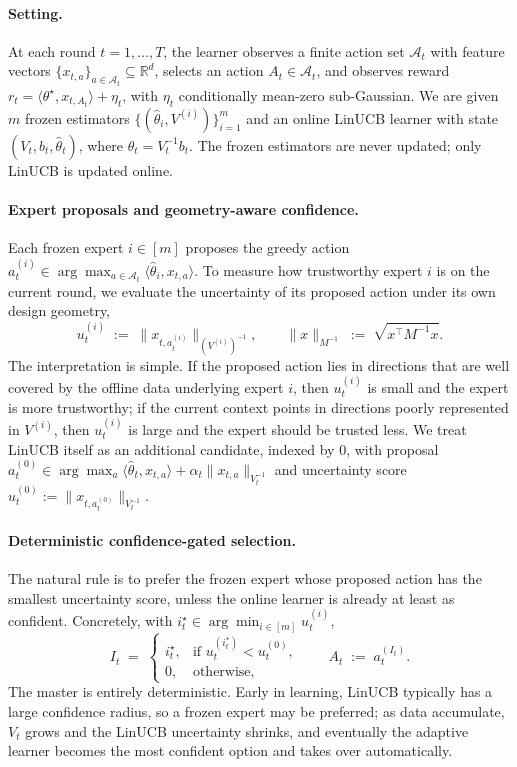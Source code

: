 \documentclass{article}
\theoremstyle{definition}
\theoremstyle{remark}
\theoremstyle{remark}
\begin{document}
\paragraph{Setting.}
At each round $t=1,\dots,T$, the learner observes a finite action set
$\mathcal A_t$ with feature vectors
$\{x_{t,a}\}_{a\in\mathcal A_t}\subseteq\mathbb R^d$, selects an action
$A_t\in\mathcal A_t$, and observes reward
$r_t = \langle\theta^\star,x_{t,A_t}\rangle + \eta_t$,
with $\eta_t$ conditionally mean-zero sub-Gaussian.
We are given $m$ frozen estimators
$\{(\widehat\theta_i,V^{(i)})\}_{i=1}^m$ and an online LinUCB learner
with state $(V_t,b_t,\widehat\theta_t)$, where
$\widehat\theta_t = V_t^{-1}b_t$. The frozen estimators are never
updated; only LinUCB is updated online.

\paragraph{Expert proposals and geometry-aware confidence.}
Each frozen expert $i\in[m]$ proposes the greedy action
$a_t^{(i)}\in\arg\max_{a\in\mathcal A_t}\langle\widehat\theta_i,x_{t,a}\rangle$.
To measure how trustworthy expert $i$ is on the current round, we
evaluate the uncertainty of its proposed action under its own design
geometry,
\[
u_t^{(i)} \;:=\; \bigl\|x_{t,a_t^{(i)}}\bigr\|_{(V^{(i)})^{-1}},
\qquad
\|x\|_{M^{-1}} \;:=\; \sqrt{x^\top M^{-1}x}.
\]
The interpretation is simple. If the proposed action lies in directions
that are well covered by the offline data underlying expert $i$, then
$u_t^{(i)}$ is small and the expert is more trustworthy; if the current
context points in directions poorly represented in $V^{(i)}$, then
$u_t^{(i)}$ is large and the expert should be trusted less. We treat
LinUCB itself as an additional candidate, indexed by $0$, with proposal
$a_t^{(0)}\in\arg\max_a\langle\widehat\theta_t,x_{t,a}\rangle+\alpha_t\|x_{t,a}\|_{V_t^{-1}}$
and uncertainty score $u_t^{(0)} := \|x_{t,a_t^{(0)}}\|_{V_t^{-1}}$.

\paragraph{Deterministic confidence-gated selection.}
The natural rule is to prefer the frozen expert whose proposed action
has the smallest uncertainty score, unless the online learner is
already at least as confident. Concretely, with
$i_t^\star\in\arg\min_{i\in[m]}u_t^{(i)}$,
\[
I_t \;=\;
\begin{cases}
i_t^\star, & \text{if }u_t^{(i_t^\star)}<u_t^{(0)},\\[2pt]
0, & \text{otherwise},
\end{cases}
\qquad A_t \;:=\; a_t^{(I_t)}.
\]
The master is entirely deterministic. Early in learning, LinUCB
typically has a large confidence radius, so a frozen expert may be
preferred; as data accumulate, $V_t$ grows and the LinUCB uncertainty
shrinks, and eventually the adaptive learner becomes the most confident
option and takes over automatically.
\end{document}
